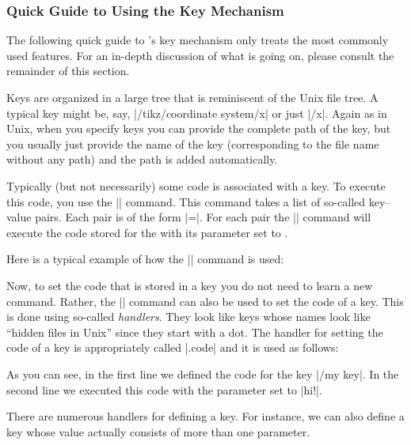 \subsubsection{Quick Guide to Using the Key Mechanism}

The following quick guide to \pgfname's key mechanism only treats the
most commonly used features. For an in-depth discussion of what is
going on, please consult the remainder of this section.

Keys are organized in a large tree that is reminiscent of the Unix
file tree. A typical key might be, say, |/tikz/coordinate system/x|
or just |/x|. Again as in Unix, when you specify keys you can provide
the complete path of the key, but you usually just provide the name of
the key (corresponding to the file name without any path) and the path
is added automatically.

Typically (but not necessarily) some code is associated with a key. To
execute this code, you use the |\pgfkeys| command. This command takes
a list of so-called key--value pairs. Each pair is of the form
|=|. For each pair the |\pgfkeys| command will
execute the code stored for the  with its parameter set to
.

Here is a typical example of how the |\pgfkeys| command is used:
\begin{codeexample}
\end{codeexample}

Now, to set the code that is stored in a key you do not need to learn
a new command. Rather, the |\pgfkeys| command can also be used to set
the code of a key. This is done using so-called \emph{handlers}. They
look like keys whose names look like ``hidden files in Unix'' since
they start with a dot. The handler for setting the code of a key is
appropriately called |.code| and it is used as follows:
\begin{codeexample}[]
\end{codeexample}
As you can see, in the first line we defined the code for the key
|/my key|. In the second line we executed this code with the parameter
set to |hi!|.

There are numerous handlers for defining a key. For instance, we can
also define a key whose value actually consists of more than one
parameter. 
\begin{codeexample}[]
\end{codeexample}

